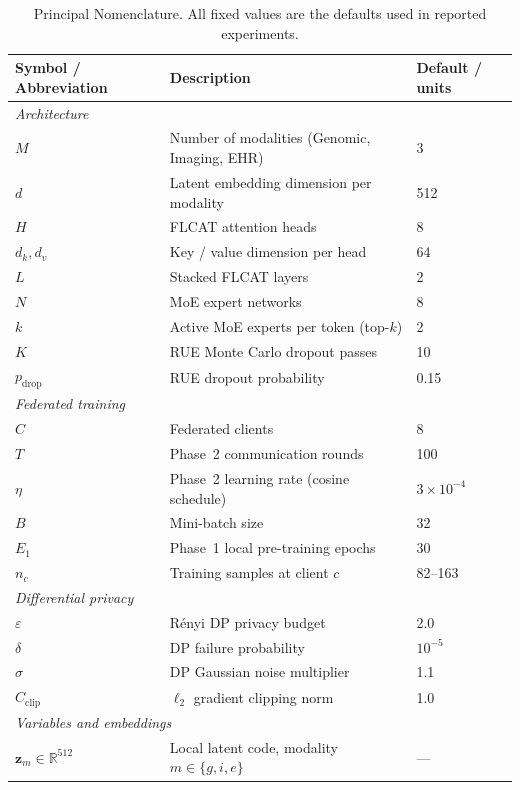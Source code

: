 \documentclass{ieeeaccess}
\begin{document}
\begin{table}[!t]
\renewcommand{\arraystretch}{1.30}
\caption{Principal Nomenclature. All fixed values are the defaults used in reported experiments.}
\label{tab:nomenclature}
\centering
\renewcommand{\arraystretch}{1.22}
\setlength{\tabcolsep}{7pt}
\begin{tabular}{lll}
\toprule
\textbf{Symbol / Abbreviation} & \textbf{Description} & \textbf{Default / units}\\
\midrule
\multicolumn{3}{l}{\textit{Architecture}}\\
$M$ & Number of modalities (Genomic, Imaging, EHR) & 3\\
$d$ & Latent embedding dimension per modality & 512\\
$H$ & FLCAT attention heads & 8\\
$d_k, d_v$ & Key / value dimension per head & 64\\
$L$ & Stacked FLCAT layers & 2\\
$N$ & MoE expert networks & 8\\
$k$ & Active MoE experts per token (top-$k$) & 2\\
$K$ & RUE Monte Carlo dropout passes & 10\\
$p_{\mathrm{drop}}$ & RUE dropout probability & 0.15\\
\midrule
\multicolumn{3}{l}{\textit{Federated training}}\\
$C$ & Federated clients & 8\\
$T$ & Phase~2 communication rounds & 100\\
$\eta$ & Phase~2 learning rate (cosine schedule) & $3\times10^{-4}$\\
$B$ & Mini-batch size & 32\\
$E_1$ & Phase~1 local pre-training epochs & 30\\
$n_c$ & Training samples at client $c$ & 82--163\\
\midrule
\multicolumn{3}{l}{\textit{Differential privacy}}\\
$\varepsilon$ & R\'{e}nyi DP privacy budget & 2.0\\
$\delta$ & DP failure probability & $10^{-5}$\\
$\sigma$ & DP Gaussian noise multiplier & 1.1\\
$C_{\mathrm{clip}}$ & $\ell_2$ gradient clipping norm & 1.0\\
\midrule
\multicolumn{3}{l}{\textit{Variables and embeddings}}\\
$\mathbf{z}_m \in \mathbb{R}^{512}$ & Local latent code, modality $m\in\{g,i,e\}$ & ---\\

\end{tabular}
\end{table}
\end{document}
